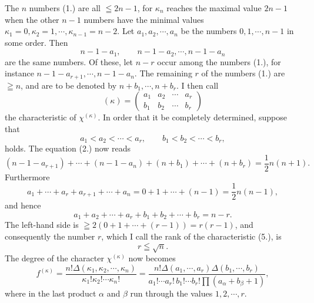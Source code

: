 \documentclass[11pt]{article}
\begin{document}
The $n$ numbers (1.) are all $\leqq2n-1$, for $\kappa_n$ reaches the maximal value $2n-1$ when the other $n-1$ numbers have the minimal values $\kappa_1=0,
\kappa_2=1,
\cdots,
\kappa_{n-1}=n-2$. Let $a_1,
 a_2,
\cdots,
 a_n$ be the numbers $0,1,
\cdots,n-1$ in some order. Then
\[
 n-1-a_1,
\qquad n-1-a_2,
\cdots,
 n-1-a_n
\]
are the same numbers. Of these, let $n-r$ occur among the numbers (1.), for instance $n-1-a_{r+1},
\cdots,n-1-a_n$. The remaining $r$ of the numbers (1.) are $\geqq n$, and are to be denoted by $n+b_1,
\cdots,n+b_r$. I then call
\begin{equation}\tag{5.}
 (\kappa)=\left(\begin{matrix}a_1&a_2&\cdots&a_r\\ b_1&b_2&\cdots&b_r\end{matrix}\right)
\end{equation}
the characteristic of $\chi^{(\kappa)}$. In order that it be completely determined, suppose that
\begin{equation}\tag{6.}
 a_1<a_2<\cdots<a_r,\qquad b_1<b_2<\cdots<b_r,
\end{equation}
holds. The equation (2.) now reads
\[
 (n-1-a_{r+1})+\cdots+(n-1-a_n)+(n+b_1)+\cdots+(n+b_r)=\frac12n(n+1).
\]
Furthermore
\[
 a_1+\cdots+a_r+a_{r+1}+\cdots+a_n=0+1+\cdots+(n-1)=\frac12n(n-1),
\]
and hence
\begin{equation}\tag{7.}
 a_1+a_2+\cdots+a_r+b_1+b_2+\cdots+b_r=n-r.
\end{equation}
The left-hand side is $\geqq2(0+1+\cdots+(r-1))=r(r-1)$, and consequently the number $r$, which I call the rank of the characteristic (5.), is
\begin{equation}\tag{8.}
 r\leqq\sqrt n.
\end{equation}
The degree of the character $\chi^{(\kappa)}$ now becomes
\begin{equation}\tag{9.}
 f^{(\kappa)}=\frac{n!\Delta(\kappa_1,
\kappa_2,
\cdots,
\kappa_n)}{\kappa_1!\kappa_2!\cdots\kappa_n!}
 =\frac{n!\Delta(a_1,
\cdots,a_r)\Delta(b_1,
\cdots,b_r)}{a_1!\cdots a_r!\,b_1!\cdots b_r!\prod(a_\alpha+b_\beta+1)},
\end{equation}
where in the last product $\alpha$ and $\beta$ run through the values $1,2,\cdots,r$.
\end{document}
